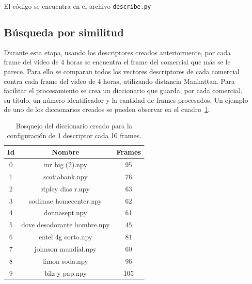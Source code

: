 \documentclass[14pt,letterpaper,hidelinks]{extarticle}
\begin{document}
El código se encuentra en el archivo \verb+describe.py+

\subsection{Búsqueda por similitud}
Durante esta etapa, usando los descriptores creados anteriormente, por cada frame del video de 4 horas se encuentra el frame del comercial que más se le parece. Para ello se comparan todos los vectores descriptores de cada comercial contra cada frame del video de 4 horas, utilizando distancia Manhattan. Para facilitar el procesamiento se crea un diccionario que guarda, por cada comercial, su título, un número identificador y la cantidad de frames procesados. Un ejemplo de uno de los diccionarios creados se pueden observar en el cuadro~\ref{tab:dict}.\\

\begin{table}[]
\centering
\begin{tabular}{@{}ccc@{}}
\toprule
Id & Nombre                      & Frames \\ \midrule
0  & mr big (2).npy              & 95     \\
1  & scotiabank.npy              & 76     \\
2  & ripley dias r.npy           & 63     \\
3  & sodimac homecenter.npy      & 62     \\
4  & donnasept.npy               & 61     \\
5  & dove desodorante hombre.npy & 45     \\
6  & entel 4g corto.npy          & 81     \\
7  & johnson mundial.npy         & 60     \\
8  & limon soda.npy              & 96     \\
9  & bilz y pap.npy              & 105    \\ \bottomrule
\end{tabular}
\captionsetup{justification=centering,margin=2cm}
\caption{Bosquejo del diccionario creado para la configuración de 1 descriptor cada 10 frames. \label{tab:dict}}
\end{table}
\end{document}
